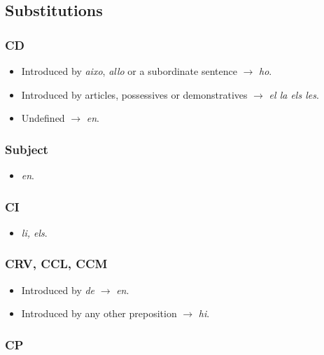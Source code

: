 \documentclass{article}
\begin{document}
\subsection*{Substitutions}

\subsubsection*{CD}

\begin{itemize}
    \item Introduced by \emph{aixo}, \emph{allo} or a subordinate sentence
    $\rightarrow$ \emph{ho}.
    \item Introduced by articles, possessives or demonstratives $\rightarrow$
    \emph{el la els les}.
    \item Undefined $\rightarrow$ \emph{en}.
\end{itemize}

\subsubsection*{Subject}

\begin{itemize}
    \item \emph{en}.
\end{itemize}

\subsubsection*{CI}

\begin{itemize}
    \item \emph{li, els}.
\end{itemize}

\subsubsection*{CRV, CCL, CCM}

\begin{itemize}
    \item Introduced by \emph{de} $\rightarrow$ \emph{en}.
    \item Introduced by any other preposition $\rightarrow$ \emph{hi}.
\end{itemize}

\subsubsection*{CP}
\end{document}

